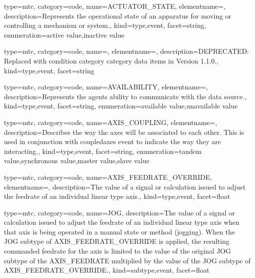 {
  type=mtc,
  category=code,
  name={ACTUATOR\_STATE},
  elementname=,
  description={Represents the operational state of an apparatus for moving or controlling a mechanism or system.},
  kind={type,event},
  facet={\gls{string}},
  enumeration={\gls{active value},\gls{inactive value}}
}


{
  type=mtc,
  category=code,
  name=,
  elementname=,
  description={DEPRECATED: Replaced with \gls{condition category} category data items in Version 1.1.0.},
  kind={type,event},
  facet={\gls{string}}
}


{
  type=mtc,
  category=code,
  name={AVAILABILITY},
  elementname=,
  description={Represents the \gls{agent}s ability to communicate with the data source.},
  kind={type,event},
  facet={\gls{string}},
  enumeration={\gls{available value},\gls{unavailable value}}
}


{
  type=mtc,
  category=code,
  name={AXIS\_COUPLING},
  elementname=,
  description={Describes the way the axes will be associated to each other. This is used in conjunction with \gls{coupledaxes event} to indicate the way they are interacting.},
  kind={type,event},
  facet={\gls{string}},
  enumeration={\gls{tandem value},\gls{synchronous value},\gls{master value},\gls{slave value}}
}


{
  type=mtc,
  category=code,
  name={AXIS\_FEEDRATE\_OVERRIDE},
  elementname=,
  description={The value of a signal or calculation issued to adjust the feedrate of an individual linear type axis.},
  kind={type,event},
  facet={\gls{float}}
}


{
  type=mtc,
  category=code,
  name={JOG},
  description={The value of a signal or calculation issued to adjust the feedrate of an individual linear type axis when that axis is being operated in a manual state or method (jogging).   \newline When the JOG subtype of AXIS\_FEEDRATE\_OVERRIDE is applied, the resulting commanded feedrate for the axis is limited to the value of the original JOG subtype of the AXIS\_FEEDRATE multiplied by the value of the JOG subtype of AXIS\_FEEDRATE\_OVERRIDE.},
  kind={subtype,event},
  facet={\gls{float}}
}


